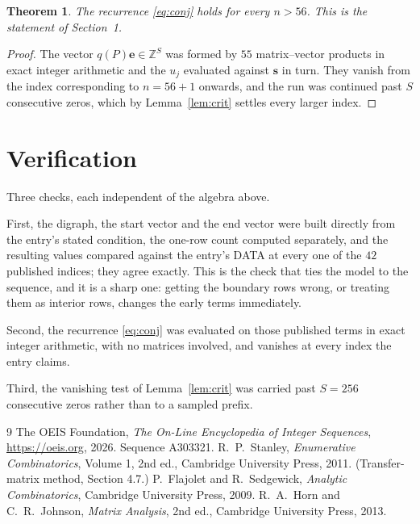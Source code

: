 \documentclass[11pt,a4paper]{article}
\theoremstyle{plain}
\newtheorem{theorem}{Theorem}
\theoremstyle{definition}
\begin{document}
\begin{theorem}
The recurrence \eqref{eq:conj} holds for every $n>56$. This is the statement of
Section~1.
\end{theorem}

\begin{proof}
The vector $q(P)\mathbf{e}\in\mathbb{Z}^{S}$ was formed by $55$ matrix--vector
products in exact integer arithmetic and the $u_j$ evaluated against $\mathbf{s}$ in turn.
They vanish from the index corresponding to $n=56+1$ onwards, and the run was continued
past $S$ consecutive zeros, which by Lemma~\ref{lem:crit} settles every larger index.
\end{proof}

\section{Verification}

Three checks, each independent of the algebra above.

First, the digraph, the start vector and the end vector were built directly from the
entry's stated condition, the one-row count computed separately, and the resulting values
compared against the entry's DATA at every one of the $42$ published indices; they
agree exactly. This is the check that ties the model to the sequence, and it is a sharp one:
getting the boundary rows wrong, or treating them as interior rows, changes the early terms
immediately.

Second, the recurrence \eqref{eq:conj} was evaluated on those published terms in exact
integer arithmetic, with no matrices involved, and vanishes at every index the entry claims.

Third, the vanishing test of Lemma~\ref{lem:crit} was carried past $S=256$ consecutive
zeros rather than to a sampled prefix.

\begin{thebibliography}{9}
 The OEIS Foundation, \emph{The On-Line Encyclopedia of Integer
Sequences}, \url{https://oeis.org}, 2026. Sequence A303321.
 R.~P.~Stanley, \emph{Enumerative Combinatorics}, Volume 1, 2nd ed.,
Cambridge University Press, 2011. (Transfer-matrix method, Section 4.7.)
 P.~Flajolet and R.~Sedgewick, \emph{Analytic Combinatorics}, Cambridge
University Press, 2009.
 R.~A.~Horn and C.~R.~Johnson, \emph{Matrix Analysis}, 2nd ed., Cambridge
University Press, 2013.
\end{thebibliography}
\end{document}
